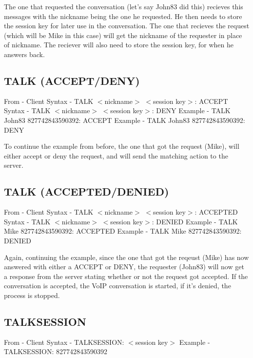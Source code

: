 \documentclass[12pt]{rapport}
\begin{document}
\noindent The one that requested the conversation (let's say John83
did this) recieves this messages with the nickname being the one he
requested. He then needs to store the session key for later use in the
conversation.\newline
\noindent The one that recieves the request (which will be Mike in
this case) will get the nickname of the requester in place of
nickname. The reciever will also need to store the session key, for
when he answers back.

\subsection*{TALK (ACCEPT/DENY)}
From    - Client\newline
Syntax  - TALK $<$nickname$>$ $<$session key$>$: ACCEPT\newline
Syntax  - TALK $<$nickname$>$ $<$session key$>$: DENY\newline
Example - TALK John83 827742843590392: ACCEPT\newline
Example - TALK John83 827742843590392: DENY\newline

\noindent To continue the example from before, the one that got the
request (Mike), will either accept or deny the request, and will send
the matching action to the server.

\subsection*{TALK (ACCEPTED/DENIED)}
From    - Client\newline
Syntax  - TALK $<$nickname$>$ $<$session key$>$: ACCEPTED\newline
Syntax  - TALK $<$nickname$>$ $<$session key$>$: DENIED\newline
Example - TALK Mike 827742843590392: ACCEPTED\newline
Example - TALK Mike 827742843590392: DENIED\newline

\noindent Again, continuing the example, since the one that got the
reqeust (Mike) has now answered with either a ACCEPT or DENY, the
requester (John83) will now get a response from the server stating
whether or not the request got accepted. If the conversation is
accepted, the VoIP conversation is started, if it's denied, the
process is stopped.

\subsection*{TALKSESSION}
From    - Client\newline
Syntax  - TALKSESSION: $<$session key$>$\newline
Example - TALKSESSION: 827742843590392\newline
\end{document}
